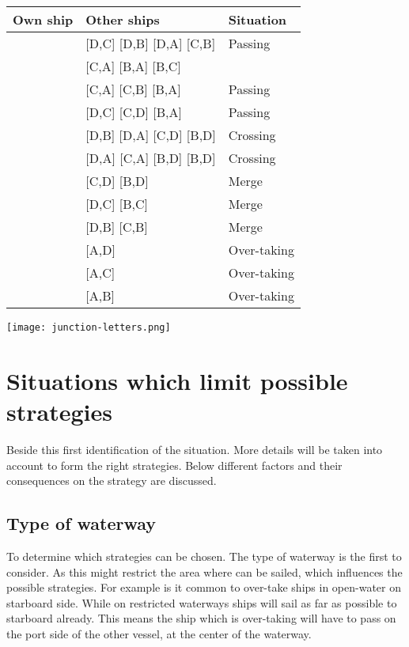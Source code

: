 \begin{minipage}{\textwidth}
	\begin{minipage}[b]{0.69\textwidth}
		\centering
		\begin{tabular}{l|l|l}
			Own ship & Other ships & Situation\\
			\hline
			\big[A,D\big] & [D,C] [D,B] [D,A] [C,B] & Passing \\
						& [C,A] [B,A] [B,C] & \\
			\big[A,C\big] & [C,A] [C,B] [B,A] & Passing \\
			\big[A,B\big] & [D,C] [C,D] [B,A] & Passing \\
			\big[A,C\big] & [D,B] [D,A] [C,D] [B,D] & Crossing \\
			\big[A,B\big] & [D,A] [C,A] [B,D] [B,D] & Crossing \\
			\big[A,D\big] & [C,D] [B,D] & Merge \\
			\big[A,C\big] & [D,C] [B,C] & Merge \\
			\big[A,B\big] & [D,B] [C,B] & Merge \\
			\big[A,D\big] & [A,D] & Over-taking \\
			\big[A,C\big] & [A,C] & Over-taking \\
			\big[A,B\big] & [A,B] & Over-taking \\
		\end{tabular}
		\label{tab:scenarios-standard}
	\end{minipage}
	\hfill
	\begin{minipage}[b]{0.3\textwidth}
		\centering
		\texttt{[image: junction-letters.png]}
		\label{fig:junction-letters}
	\end{minipage}
\end{minipage}

\section{Situations which limit possible strategies}
Beside this first identification of the situation. More details will be taken into account to form the right strategies. Below different factors and their consequences on the strategy are discussed.

\subsection{Type of waterway}
To determine which strategies can be chosen. The type of waterway is the first to consider. As this might restrict the area where can be sailed, which influences the possible strategies. For example is it common to over-take ships in open-water on starboard side. While on restricted waterways ships will sail as far as possible to starboard already. This means the ship which is over-taking will have to pass on the port side of the other vessel, at the center of the waterway.


